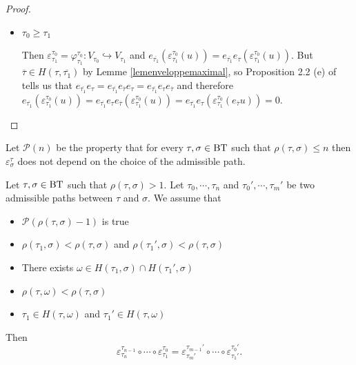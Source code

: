 \documentclass[a4paper,10pt]{amsart}
\begin{document}
\begin{proof}
\begin{itemize}
Then $\tau_{1} \in H(\tau_{0},\sigma)$ and $\tau_{0} \in H(\tau_{1},\sigma)$ so $H(\tau_{0},\sigma)=H(\tau_{1},\sigma)$. Therefore $\overline{\tau_{1}}=\overline{\tau}$. Thus $e_{\overline{\tau_{1}}}(\varepsilon_{\tau_{1}}^{\tau_{0}}(u))=e_{\overline{\tau}}(\varepsilon_{\tau_{1}}^{\tau_{0}}(u))=\varepsilon_{\tau_{1}}^{\tau_{0}}(e_{\overline{\tau}}u)=0$.

\item $\tau_{0} \geq \tau_{1}$

Then $\varepsilon_{\tau_{1}}^{\tau_{0}}=\varphi_{\tau_{1}}^{\tau_{0}}:V_{\tau_{0}} \hookrightarrow V_{\tau_{1}}$ and $e_{\overline{\tau_{1}}}(\varepsilon_{\tau_{1}}^{\tau_{0}}(u))=e_{\overline{\tau_{1}}}e_{\tau}(\varepsilon_{\tau_{1}}^{\tau_{0}}(u))$. But $\overline{\tau} \in H(\tau,\overline{\tau_{1}})$ by Lemme \ref{lemenveloppemaximal}, so Proposition 2.2 (e) of \cite{meyer_resolutions_2010} tells us that $e_{\overline{\tau_{1}}}e_{\tau}=e_{\overline{\tau_{1}}}e_{\overline{\tau}}e_{\tau}=e_{\overline{\tau_{1}}}e_{\tau}e_{\overline{\tau}}$ and therefore $e_{\overline{\tau_{1}}}(\varepsilon_{\tau_{1}}^{\tau_{0}}(u))=e_{\overline{\tau_{1}}}e_{\tau}e_{\overline{\tau}}(\varepsilon_{\tau_{1}}^{\tau_{0}}(u))=e_{\overline{\tau_{1}}}e_{\tau}(\varepsilon_{\tau_{1}}^{\tau_{0}}(e_{\overline{\tau}}u))=0$.
\end{itemize}
\end{proof}


Let $\mathcal{P}(n)$ be the property that for every $\tau,\sigma \in \bt$ such that $\rho(\tau,\sigma) \leq n$ then $\varepsilon_{\sigma}^{\tau}$ does not depend on the choice of the admissible path.

\begin{Lem}
\label{lemrecurrencechemin}
Let $\tau,\sigma \in \bt$ such that $\rho(\tau,\sigma)>1$. Let $\tau_{0},\cdots,\tau_{n}$ and $\tau_{0}',\cdots,\tau_{m}'$ be two admissible paths between $\tau$ and $\sigma$. We assume that
\begin{itemize}
\item $\mathcal{P}(\rho(\tau,\sigma)-1)$ is true
\item $\rho(\tau_{1},\sigma)<\rho(\tau,\sigma)$ and $\rho(\tau_{1}',\sigma)<\rho(\tau,\sigma)$
\item There exists $\omega \in H(\tau_{1},\sigma) \cap H(\tau_{1}',\sigma)$
\item $\rho(\tau,\omega)<\rho(\tau,\sigma)$
\item $\tau_{1} \in H(\tau,\omega)$ and  $\tau_{1}' \in H(\tau,\omega)$
\end{itemize}
Then
\[\varepsilon^{\tau_{n-1}}_{\tau_{n}} \circ \cdots \circ \varepsilon_{\tau_{1}}^{\tau_{0}}=\varepsilon^{\tau_{m-1}'}_{\tau_{m}'} \circ \cdots \circ \varepsilon_{\tau_{1}'}^{\tau_{0}'}.\]
\end{Lem}
\end{document}
